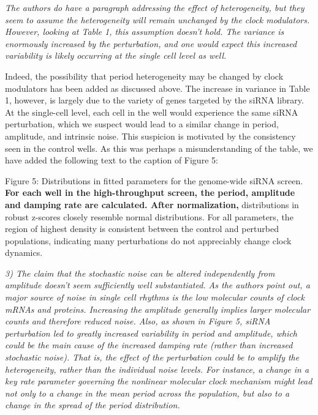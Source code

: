 \documentclass[11pt, letterpaper]{article}
\newenvironment{reviewer}{\itshape\color{gray}}{}
\newenvironment{manuscript}[1]{\begin{center}\begin{tcolorbox}[colback=green!5!white,colframe=green!75!black,width=\textwidth,title={#1},breakable,fonttitle=\bfseries]}{\end{tcolorbox}\end{center}}
\begin{document}
\begin{reviewer}
The authors do have a paragraph addressing the effect of heterogeneity, but they seem to assume the heterogeneity will remain unchanged by the clock modulators. However, looking at Table 1, this assumption doesn't hold. The variance is enormously increased by the perturbation, and one would expect this increased variability is likely occurring at the single cell level as well.
\end{reviewer}

Indeed, the possibility that period heterogeneity may be changed by clock modulators has been added as discussed above.
The increase in variance in Table 1, however, is largely due to the variety of genes targeted by the siRNA library.
At the single-cell level, each cell in the well would experience the same siRNA perturbation, which we suspect would lead to a similar change in period, amplitude, and intrinsic noise. This suspicion is motivated by the consistency seen in the control wells.
As this was perhaps a misunderstanding of the table, we have added the following text to the caption of Figure 5:

\begin{manuscript}{Page 7}
  Figure 5: Distributions in fitted parameters for the genome-wide siRNA screen. {\bfseries For each well in the high-throughput screen, the period, amplitude and damping rate are calculated. After normalization,} distributions in robust z-scores closely resemble normal distributions. For all parameters, the region of highest density is consistent between the control and perturbed populations, indicating many perturbations do not appreciably change clock dynamics. 
\end{manuscript}

\begin{reviewer}
3) The claim that the stochastic noise can be altered independently from amplitude doesn't seem sufficiently well substantiated. As the authors point out, a major source of noise in single cell rhythms is the low molecular counts of clock mRNAs and proteins. Increasing the amplitude generally implies larger molecular counts and therefore reduced noise. Also, as shown in Figure 5, siRNA perturbation led to greatly increased variability in period and amplitude, which could be the main cause of the increased damping rate (rather than increased stochastic noise). That is, the effect of the perturbation could be to amplify the heterogeneity, rather than the individual noise levels. For instance, a change in a key rate parameter governing the nonlinear molecular clock mechanism might lead not only to a change in the mean period across the population, but also to a change in the spread of the period distribution. 
\end{reviewer}
\end{document}
